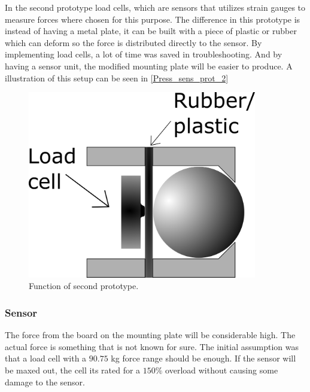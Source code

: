 In the second prototype load cells, which are sensors that utilizes strain gauges to measure forces where chosen for this purpose. The difference in this prototype is instead of having a metal plate, it can be built with a piece of plastic or rubber which can deform so the force is distributed directly to the sensor. By implementing load cells, a lot of time was saved in troubleshooting. And by having a sensor unit, the modified mounting plate will be easier to produce. A illustration of this setup can be seen in \autoref{Press_sens_prot_2}
 
\begin{figure}[H]
\begin{center}
	\includegraphics[width = 10cm]{Figures/Press_sens_func_2.png}
	\caption{Function of second prototype.}
	\label{Press_sens_prot_2}
\end{center}
\end{figure}



\subsubsection{Sensor}
The force from the board on the mounting plate will be considerable high. The actual force is something that is not known for sure. The initial assumption was that a load cell with a $90.75$ kg force range should be enough. If the sensor will be maxed out, the cell its rated for a $150\%$ overload without causing some damage to the sensor.  

